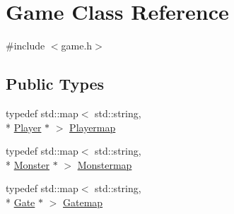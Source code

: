 \hypertarget{class_game}{\section{Game Class Reference}
\label{class_game}
}


{\ttfamily \#include $<$game.\-h$>$}

\subsection*{Public Types}
\begin{DoxyCompactItemize}
\item 
typedef std\-::map$<$ std\-::string, \\*
\hyperlink{class_player}{Player} $\ast$ $>$ \hyperlink{class_game_a11e553861e3a7fc842680e55171ed06f}{Playermap}
\item 
typedef std\-::map$<$ std\-::string, \\*
\hyperlink{class_monster}{Monster} $\ast$ $>$ \hyperlink{class_game_a2c39481e575abd66baa206771c504149}{Monstermap}
\item 
typedef std\-::map$<$ std\-::string, \\*
\hyperlink{class_gate}{Gate} $\ast$ $>$ \hyperlink{class_game_a3ac788aaa1e70509a9b9745acd17a8b5}{Gatemap}
\end{DoxyCompactItemize}
